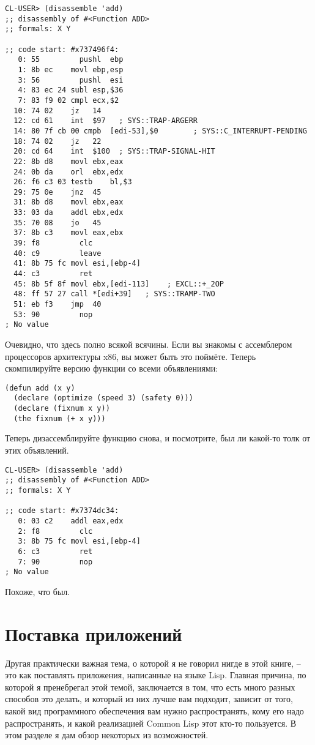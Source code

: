 \begin{lstlisting}
CL-USER> (disassemble 'add)
;; disassembly of #<Function ADD>
;; formals: X Y

;; code start: #x737496f4:
   0: 55         pushl	ebp
   1: 8b ec    movl	ebp,esp
   3: 56         pushl	esi
   4: 83 ec 24 subl	esp,$36
   7: 83 f9 02 cmpl	ecx,$2
  10: 74 02    jz	14
  12: cd 61    int	$97   ; SYS::TRAP-ARGERR
  14: 80 7f cb 00 cmpb	[edi-53],$0        ; SYS::C_INTERRUPT-PENDING
  18: 74 02    jz	22
  20: cd 64    int	$100  ; SYS::TRAP-SIGNAL-HIT
  22: 8b d8    movl	ebx,eax
  24: 0b da    orl	ebx,edx
  26: f6 c3 03 testb	bl,$3
  29: 75 0e    jnz	45
  31: 8b d8    movl	ebx,eax
  33: 03 da    addl	ebx,edx
  35: 70 08    jo	45
  37: 8b c3    movl	eax,ebx
  39: f8         clc
  40: c9         leave
  41: 8b 75 fc movl	esi,[ebp-4]
  44: c3         ret
  45: 8b 5f 8f movl	ebx,[edi-113]    ; EXCL::+_2OP
  48: ff 57 27 call	*[edi+39]   ; SYS::TRAMP-TWO
  51: eb f3    jmp	40
  53: 90         nop
; No value
\end{lstlisting}

Очевидно, что здесь полно всякой всячины. Если вы знакомы с ассемблером процессоров
архитектуры x86, вы может быть это поймёте. Теперь скомпилируйте версию функции 
со всеми объявлениями:

\begin{lstlisting}
(defun add (x y)
  (declare (optimize (speed 3) (safety 0)))
  (declare (fixnum x y))
  (the fixnum (+ x y)))
\end{lstlisting}

Теперь дизассемблируйте функцию  снова, и посмотрите, был ли какой-то толк от
этих объявлений.

\begin{lstlisting}
CL-USER> (disassemble 'add)
;; disassembly of #<Function ADD>
;; formals: X Y

;; code start: #x7374dc34:
   0: 03 c2    addl	eax,edx
   2: f8         clc
   3: 8b 75 fc movl	esi,[ebp-4]
   6: c3         ret
   7: 90         nop
; No value
\end{lstlisting}

Похоже, что был.

\section{Поставка приложений}

Другая практически важная тема, о которой я не говорил нигде в этой книге, -- это как
поставлять приложения, написанные на языке Lisp. Главная причина, по которой я пренебрегал
этой темой, заключается в том, что есть много разных способов это делать, и который из них
лучше вам подходит, зависит от того, какой вид программного обеспечения вам нужно
распространять, кому его надо распространять, и какой реализацией Common Lisp этот кто-то
пользуется. В этом разделе я дам обзор некоторых из возможностей.

